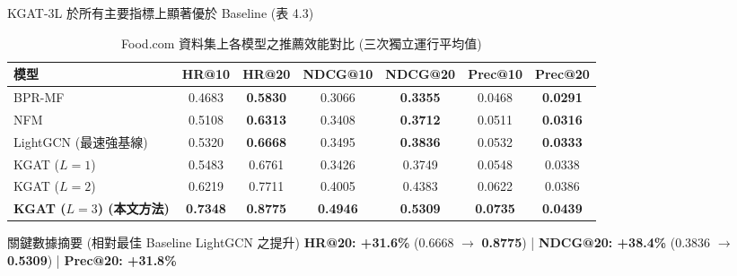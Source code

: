 \documentclass[aspectratio=169, 10pt]{beamer}
\begin{document}
\begin{frame}{KGAT-3L 於所有主要指標上顯著優於 Baseline (表 4.3)}
  \begin{table}
    \centering
    \caption{Food.com 資料集上各模型之推薦效能對比 (三次獨立運行平均值)}
    \small
    \begin{tabular}{l c c c c c c}
      \toprule
      \textbf{模型} & \textbf{HR@10} & \textbf{HR@20} & \textbf{NDCG@10} & \textbf{NDCG@20} & \textbf{Prec@10} & \textbf{Prec@20} \\
      \midrule
      BPR-MF & 0.4683 & \textbf{0.5830} & 0.3066 & \textbf{0.3355} & 0.0468 & \textbf{0.0291} \\
      NFM & 0.5108 & \textbf{0.6313} & 0.3408 & \textbf{0.3712} & 0.0511 & \textbf{0.0316} \\
      LightGCN (最速強基線) & 0.5320 & \textbf{0.6668} & 0.3495 & \textbf{0.3836} & 0.0532 & \textbf{0.0333} \\
      \midrule
      KGAT ($L=1$) & 0.5483 & 0.6761 & 0.3426 & 0.3749 & 0.0548 & 0.0338 \\
      KGAT ($L=2$) & 0.6219 & 0.7711 & 0.4005 & 0.4383 & 0.0622 & 0.0386 \\
      \textbf{KGAT ($L=3$) (本文方法)} & \textbf{0.7348} & \textbf{0.8775} & \textbf{0.4946} & \textbf{0.5309} & \textbf{0.0735} & \textbf{0.0439} \\
      \bottomrule
    \end{tabular}
  \end{table}
  
  \begin{block}{關鍵數據摘要 (相對最佳 Baseline LightGCN 之提升)}
    \centering
    \textbf{HR@20: \textcolor{HighlightRed}{+31.6\%}} (0.6668 $\rightarrow$ \textbf{0.8775}) \quad | \quad
    \textbf{NDCG@20: \textcolor{HighlightRed}{+38.4\%}} (0.3836 $\rightarrow$ \textbf{0.5309}) \quad | \quad
    \textbf{Prec@20: \textcolor{HighlightRed}{+31.8\%}}
  \end{block}
\end{frame}
\end{document}
